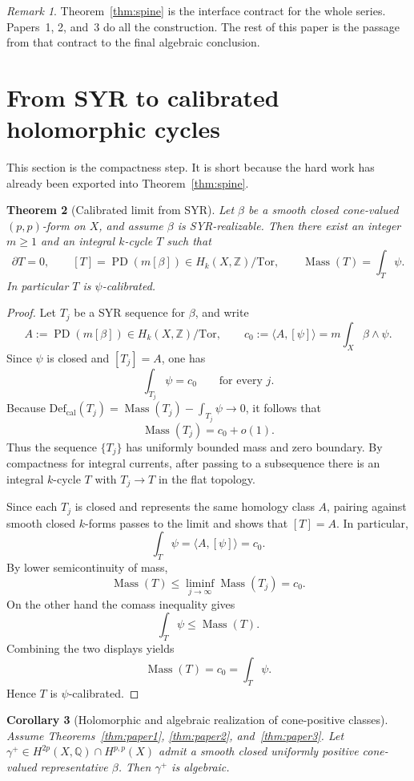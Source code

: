 \documentclass[11pt]{article}
\numberwithin{equation}{section}
\theoremstyle{plain}
\newtheorem{theorem}{Theorem}[section]
\newtheorem{corollary}[theorem]{Corollary}
\theoremstyle{definition}
\theoremstyle{remark}
\newtheorem{remark}[theorem]{Remark}
\DeclareMathOperator{\Mass}{Mass}
\DeclareMathOperator{\PD}{PD}
\newcommand{\Q}{\mathbb{Q}}
\newcommand{\Z}{\mathbb{Z}}
\newcommand{\Defcal}{\mathrm{Def}_{\mathrm{cal}}}
\newcommand{\Tor}{\mathrm{Tor}}
\begin{document}
\begin{remark}
Theorem~\ref{thm:spine} is the interface contract for the whole series. Papers~1, 2, and~3 do all the construction. The rest of this paper is the passage from that contract to the final algebraic conclusion.
\end{remark}

\section{From SYR to calibrated holomorphic cycles}\label{sec:syr}

This section is the compactness step. It is short because the hard work has already been exported into Theorem~\ref{thm:spine}.

\begin{theorem}[Calibrated limit from SYR]\label{thm:syr-limit}
Let $\beta$ be a smooth closed cone-valued $(p,p)$-form on $X$, and assume $\beta$ is SYR-realizable. Then there exist an integer $m\ge 1$ and an integral $k$-cycle $T$ such that
\[
\partial T=0,
\qquad
[T]=\PD(m[\beta])\in H_k(X,\Z)/\Tor,
\qquad
\Mass(T)=\int_T\psi.
\]
In particular $T$ is $\psi$-calibrated.
\end{theorem}

\begin{proof}
Let $T_j$ be a SYR sequence for $\beta$, and write
\[
A:=\PD(m[\beta])\in H_k(X,\Z)/\Tor,
\qquad
c_0:=\langle A,[\psi]\rangle = m\int_X \beta\wedge\psi.
\]
Since $\psi$ is closed and $[T_j]=A$, one has
\[
\int_{T_j}\psi = c_0
\qquad\text{for every }j.
\]
Because $\Defcal(T_j)=\Mass(T_j)-\int_{T_j}\psi\to 0$, it follows that
\[
\Mass(T_j)=c_0+o(1).
\]
Thus the sequence $\{T_j\}$ has uniformly bounded mass and zero boundary. By compactness for integral currents, after passing to a subsequence there is an integral $k$-cycle $T$ with $T_j\to T$ in the flat topology.

Since each $T_j$ is closed and represents the same homology class $A$, pairing against smooth closed $k$-forms passes to the limit and shows that $[T]=A$. In particular,
\[
\int_T \psi = \langle A,[\psi]\rangle = c_0.
\]
By lower semicontinuity of mass,
\[
\Mass(T)\le \liminf_{j\to\infty} \Mass(T_j)=c_0.
\]
On the other hand the comass inequality gives
\[
\int_T\psi\le \Mass(T).
\]
Combining the two displays yields
\[
\Mass(T)=c_0=\int_T\psi.
\]
Hence $T$ is $\psi$-calibrated.
\end{proof}

\begin{corollary}[Holomorphic and algebraic realization of cone-positive classes]\label{cor:cone-positive-algebraic}
Assume Theorems~\ref{thm:paper1}, \ref{thm:paper2}, and~\ref{thm:paper3}. Let $\gamma^+\in H^{2p}(X,\Q)\cap H^{p,p}(X)$ admit a smooth closed uniformly positive cone-valued representative $\beta$. Then $\gamma^+$ is algebraic.
\end{corollary}
\end{document}
